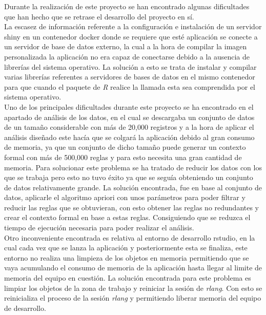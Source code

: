 \documentclass[../../main.tex]{subfiles}
\begin{document}
Durante la realización de este proyecto se han encontrado algunas dificultades que han hecho que se retrase el desarrollo del proyecto en sí. \\

La escasez de información referente a la configuración e instalación de un servidor \Gls{shiny} en un contenedor \Gls{docker} donde se requiere que esté aplicación se conecte a un servidor de base de datos externo, la cual a la hora de compilar la imagen personalizada la aplicación no era capaz de conectarse debido a la ausencia de librerías del sistema operativo. La solución a esto se trata de instalar y compilar varias librerías referentes a servidores de bases de datos en el mismo contenedor para que cuando el paquete de \textit{R} realice la llamada esta sea comprendida por el sistema operativo. \\

Uno de los principales dificultades durante este proyecto se ha encontrado en el apartado de análisis de los datos, en el cual se descargaba un conjunto de datos de un tamaño considerable con más de 20,000 registros y a la hora de aplicar el análisis diseñado este hacía que se colgará la aplicación debido al gran consumo de memoria, ya que un conjunto de dicho tamaño puede generar un contexto formal con más de 500,000 reglas y para esto necesita una gran cantidad de memoria. Para solucionar este problema se ha tratado de reducir los datos con los que se trabaja pero esto no tuvo éxito ya que se seguía obteniendo un conjunto de datos relativamente grande. La solución encontrada, fue en base al conjunto de datos, aplicarle el algoritmo \Gls{apriori} con unos parámetros para poder filtrar y reducir las reglas que se obtuvieran, con esto obtener las reglas no redundantes y crear el contexto formal en base a estas reglas. Consiguiendo que se reduzca el tiempo de ejecución necesaria para poder realizar el análisis. \\

Otro inconveniente encontrada es relativa al entorno de desarrollo \gls{rstudio}, en la cual cada vez que se lanza la aplicación y posteriormente esta se finaliza, este entorno no realiza una limpieza de los objetos en memoria permitiendo que se vaya acumulando el consumo de memoria de la aplicación hasta llegar al limite de memoria del equipo en cuestión. La solución encontrada para este problema es limpiar los objetos de la zona de trabajo y reiniciar la sesión de \textit{\gls{rlang}}. Con esto se reinicializa el proceso de la sesión \textit{\gls{rlang}} y permitiendo liberar memoria del equipo de desarrollo.  \\
\end{document}
